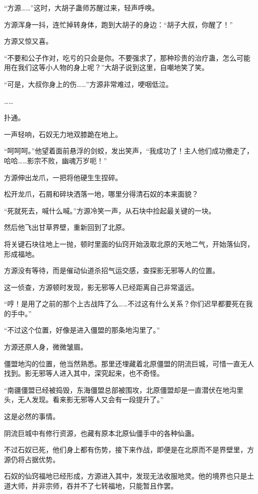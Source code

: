 \begin{this_body}
“方源……”这时，大胡子蛊师苏醒过来，轻声呼唤。

方源浑身一抖，连忙掉转身体，跑到大胡子的身边：“胡子大叔，你醒了！”

方源又惊又喜。

“不要和公子作对，吃亏的只会是你。不要强求了，那种珍贵的治疗蛊，怎么可能用在我们这等小人物的身上呢？”大胡子说到这里，自嘲地笑了笑。

“可是，大叔你身上的伤……”方源非常难过，哽咽低泣。

……

扑通。

一声轻响，石奴无力地双膝跪在地上。

“呵呵呵。”他望着面前悬浮的剑蛟，发出笑声，“我成功了！主人他们成功撤走了，哈哈……影宗不败，幽魂万岁呃！”

方源伸出龙爪，一把将他硬生生捏碎。

松开龙爪，石屑和碎块洒落一地，哪里分得清石奴的本来面貌？

“死就死去，喊什么喊。”方源冷笑一声，从石块中捡起最关键的一块。

然后他飞出甘草界壁，重新回到了北原。

将关键石块往地上一抛，顿时里面的仙窍开始汲取北原的天地二气，开始落仙窍，形成福地。

方源没有等待，而是催动仙道杀招气运交感，查探影无邪等人的位置。

这一侦查，方源顿时发现，影无邪等人已经距离自己非常遥远。

“哼！是用了之前的那个上古战阵了么……不过这有什么关系？你们迟早都要死在我的手中。”

“不过这个位置，好像是进入僵盟的那条地沟里了。”

方源还原人身，微微皱眉。

僵盟地沟的位置，他当然熟悉。那里还埋藏着北原僵盟的阴流巨城，可惜一直无人找到。影无邪等人进入其中，深究起来，也不奇怪。

“南疆僵盟已经被捣毁，东海僵盟总部被围攻，北原僵盟却是一直潜伏在地沟里头，无人发现。看来影无邪等人又会有一段提升了。”

这是必然的事情。

阴流巨城中有修行资源，也藏有原本北原仙僵手中的各种仙蛊。

不过石奴已死，他们身上都有伤势，接下来作战，即便是在北原而不是界壁里，方源仍将占据优势。

石奴的仙窍福地已经形成，方源进入其中，发现无法收服地灵。他的境界也只是土道大师，并非宗师，吞并不了七转福地，只能暂且作罢。


\end{this_body}
